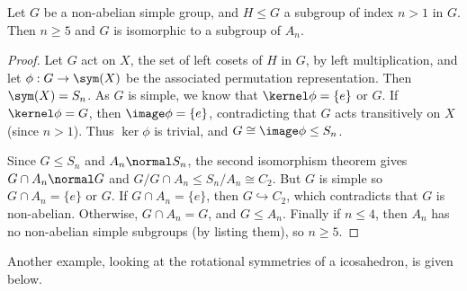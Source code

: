 \begin{theorem}
	Let $G$ be a non-abelian simple group, and $H\leq G$ a subgroup of index $n > 1$ in $G$. Then $n \geq 5$ and $G$ is isomorphic to a subgroup of $A_n$.
\end{theorem}
\begin{proof}
	Let $G$ act on $X$, the set of left cosets of $H$ in $G$, by left multiplication, and let $\phi: G \rightarrow \sym(X)$ be the associated permutation representation. Then $\sym(X) = S_n$. As $G$ is simple, we know that $\kernel \phi = \{e\}$ or $G$. If $\kernel \phi = G$, then $\image \phi = \{e\}$, contradicting that $G$ acts transitively on $X$ (since $n > 1$). Thus $\ker \phi$ is trivial, and $G \cong \image \phi \leq S_n$.

	Since $G \leq S_n$ and $A_n \normal S_n$, the second isomorphism theorem gives $G \cap A_n \normal G$ and $G / G \cap A_n \leq S_n / A_n \cong C_2$. But $G$ is simple so $G \cap A_n = \{e\}$ or $G$. If $G \cap A_n = \{e\}$, then $G \hookrightarrow C_2$, which contradicts that $G$ is non-abelian. Otherwise, $G \cap A_n = G$, and $G \leq A_n$. Finally if $n \leq 4$, then $A_n$ has no non-abelian simple subgroups (by listing them), so $n \geq 5$.
\end{proof}

Another example, looking at the rotational symmetries of a icosahedron, is given below.

